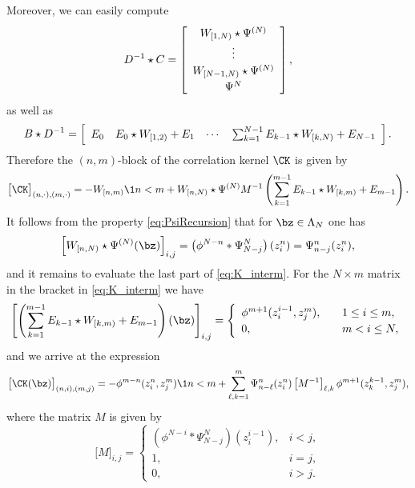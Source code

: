 \documentclass[]{pcmi}
\theoremstyle{plain}
\theoremstyle{definition}
\begin{document}
\noindent Moreover, we can easily compute
\[\arraycolsep=5pt\renewcommand\arraystretch{1.2}
D^{-1} \star C = \left[\begin{array}{c}
W_{[1,N)} \star \Psi^{(N)} \\
\vdots \\
W_{[N-1,N)} \star \Psi^{(N)} \\
\Psi^{N}
\end{array}\right],
\]
as well as
\[
B \star D^{-1} = \arraycolsep=5pt\renewcommand\arraystretch{1.2} \left[\begin{array}{cccc}
E_0 & E_0 \star W_{[1,2)}+E_1 & \cdots & \sum_{k=1}^{N-1} E_{k-1} \star W_{[k,N)}+ E_{N-1}
\end{array}\right].
\]
Therefore the $(n,m)$-block of the correlation kernel $\CK$ is given by
\begin{equation}\label{eq:K_interm}
\bigl[\CK \bigr]_{(n, \cdot), (m, \cdot)} = -W_{[n,m)} \1{n < m}+W_{[n,N)} \star \Psi^{(N)} M^{-1} \left(\sum_{k=1}^{m-1} E_{k-1} \star W_{[k,m)}+ E_{m-1}\right).
\end{equation}
It follows from the property \eqref{eq:PsiRecursion} that for $\bz \in \Lambda_N$ one has
\[
\left[W_{[n,N)} \star \Psi^{(N)}(\bz)\right]_{i,j} = \left(\phi^{N - n} * \Psi^N_{N-j}\right)(z_i^n)=\Psi^{n}_{n-j}(z_i^n),
\]
and it remains to evaluate the last part of \eqref{eq:K_interm}. For the $N\times m$ matrix in the bracket in \eqref{eq:K_interm} we have
\[
\left[ \left(\sum_{k=1}^{m-1} E_{k-1} \star W_{[k,m)}+ E_{m-1} \right)(\bz)\right]_{i,j} =
\left\{\begin{array}{ll}
\phi^{m + 1}(z_i^{i-1},z_j^m),\quad & 1\leq i \leq m,\\
0, & m < i \leq N,
\end{array}\right.
\]
and we arrive at the expression
\[
 \bigl[\CK(\bz)\bigr]_{(n, i), (m, j)} = - \phi^{m - n}(z_i^n,z_j^{m}) \1{n < m} + \sum_{\ell, k = 1}^m \Psi^{n}_{n-\ell}(z_i^n)\, \bigl[M^{-1}\bigr]_{\ell, k}\, \phi^{m + 1}(z_k^{k-1},z_j^m),
\]
where the matrix $M$ is given by
\begin{equation}\label{eq:MatrixM}
 	\bigl[M\bigr]_{i, j} = 	
\begin{cases}
 	\left(\phi^{N - i} * \Psi^N_{N- j}\right)(z_i^{i-1}),&  i < j,\\
	1,& i = j,\\
	0,& i > j.
\end{cases}
\end{equation}
\end{document}
